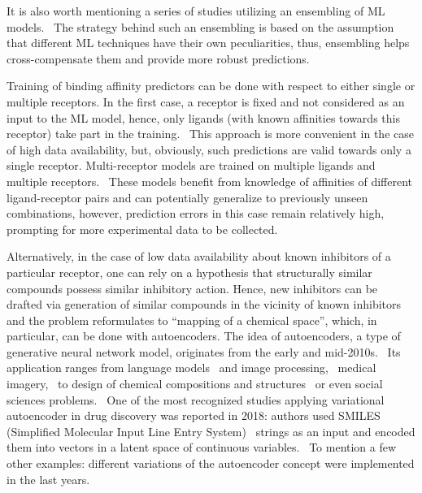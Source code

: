 \documentclass[12pt]{article}
\begin{document}
It is also worth mentioning a series of studies utilizing an ensembling of ML models.~\cite{Chen2019,Kwon2020,Schneider2020,Druchok2021}
The strategy behind such an ensembling is based on the assumption that different ML techniques have their own peculiarities, thus, ensembling helps cross-compensate them and provide more robust predictions.

Training of binding affinity predictors can be done with respect to either single or multiple receptors.
In the first case, a receptor is fixed and not considered as an input to the ML model, hence, only ligands (with known affinities towards this receptor) take part in the training.~\cite{Druchok2021}
This approach is more convenient in the case of high data availability, but, obviously, such predictions are valid towards only a single receptor.
Multi-receptor models are trained on multiple ligands and multiple receptors.~\cite{Nikolaienko2022}
These models benefit from knowledge of affinities of different ligand-receptor pairs and can potentially generalize to previously unseen combinations, however, prediction errors in this case remain relatively high, prompting for more experimental data to be collected.~\cite{Nikolaienko2022,Zhu2022}

Alternatively, in the case of low data availability about known inhibitors of a particular receptor, one can rely on a hypothesis that structurally similar compounds possess similar inhibitory action.
Hence, new inhibitors can be drafted via generation of similar compounds in the vicinity of known inhibitors and the problem reformulates to ``mapping of a chemical space'', which, in particular, can be done with autoencoders.
The idea of autoencoders, a type of generative neural network model, originates from the early and mid-2010s.~\cite{Kingma2014,Rezende2014}
Its application ranges from language models~\cite{Bowman2016} and image processing,~\cite{Zhou2018} medical imagery,~\cite{Zhao2019,Ternes2022} to design of chemical compositions and structures~\cite{Vasylenko2021} or even social sciences problems.~\cite{Huang2019}
One of the most recognized studies applying variational autoencoder in drug discovery was reported in 2018: authors used SMILES (Simplified Molecular Input Line Entry System)~\cite{Weininger1988,Weininger1989,SMILES:www} strings as an input and encoded them into vectors in a latent space of continuous variables.~\cite{GomezBombarelli2018}
To mention a few other examples: different variations of the autoencoder concept were implemented in the last years.~\cite{Lim2018,Joo2020,Druchok2021b,Zhang2022,He2022}
\end{document}
